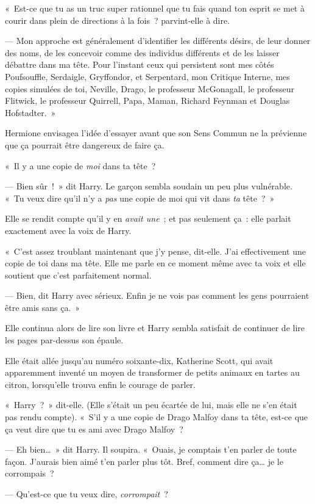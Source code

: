 «~Est-ce que tu as un truc super rationnel que tu fais quand ton esprit se met à courir dans plein de directions à la fois~? parvint-elle à dire.

--- Mon approche est généralement d'identifier les différents désirs, de leur donner des noms, de les concevoir comme des individus différents et de les laisser débattre dans ma tête.
Pour l'instant ceux qui persistent sont mes côtés Poufsouffle, Serdaigle, Gryffondor, et Serpentard, mon Critique Interne, mes copies simulées de toi, Neville, Drago, le professeur McGonagall, le professeur Flitwick, le professeur Quirrell, Papa, Maman, Richard Feynman et Douglas Hofstadter.~»

Hermione envisagea l'idée d'essayer avant que son Sens Commun ne la prévienne que ça pourrait être dangereux de faire ça.

«~Il y a une copie de \emph{moi} dans ta tête~?

--- Bien sûr~!~»
dit Harry.
Le garçon sembla soudain un peu plus vulnérable.
«~Tu veux dire qu'il n'y a \emph{pas} une copie de moi qui vit dans \emph{ta} tête~?~»

Elle se rendit compte qu'il y en \emph{avait une}~; et pas seulement ça~: elle parlait exactement avec la voix de Harry.

«~C'est assez troublant maintenant que j'y pense, dit-elle.
J'ai effectivement une copie de toi dans ma tête.
Elle me parle en ce moment même avec ta voix et elle soutient que c'est parfaitement normal.

--- Bien, dit Harry avec sérieux.
Enfin je ne vois pas comment les gens pourraient être amis sans ça.~»

Elle continua alors de lire son livre et Harry sembla satisfait de continuer de lire les pages par-dessus son épaule.

Elle était allée jusqu'au numéro soixante-dix, Katherine Scott, qui avait apparemment inventé un moyen de transformer de petits animaux en tartes au citron, lorsqu'elle trouva enfin le courage de parler.

«~Harry~?~»
dit-elle.
(Elle s'était un peu écartée de lui, mais elle ne s'en était pas rendu compte).
«~S'il y a une copie de Drago Malfoy dans ta tête, est-ce que ça veut dire que tu es ami avec Drago Malfoy~?

--- Eh bien…~»
dit Harry.
Il soupira.
«~Ouais, je comptais t'en parler de toute façon.
J'aurais bien aimé t'en parler plus tôt.
Bref, comment dire ça… je le corrompais~?

--- Qu'est-ce que tu veux dire, \emph{corrompait}~?

